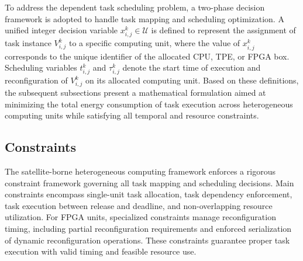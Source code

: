 \documentclass{IEEEtaes}
\begin{document}

To address the dependent task scheduling problem, a two-phase decision framework is adopted to handle task mapping and scheduling optimization. A unified integer decision variable $x_{i,j}^k \in \mathcal{U}$ is defined to represent the assignment of task instance $V_{i,j}^k$ to a specific computing unit, where the value of $x_{i,j}^k$ corresponds to the unique identifier of the allocated CPU, TPE, or FPGA box. Scheduling variables $t_{i,j}^{k}$ and $\tau_{i,j}^{k}$ denote the start time of execution and reconfiguration of $V_{i,j}^{k}$ on its allocated computing unit. Based on these definitions, the subsequent subsections present a mathematical formulation aimed at minimizing the total energy consumption of task execution across heterogeneous computing units while satisfying all temporal and resource constraints.

\subsection{Constraints}

The satellite-borne heterogeneous computing framework enforces a rigorous constraint framework governing all task mapping and scheduling decisions. Main constraints encompass single-unit task allocation, task dependency enforcement, task execution between release and deadline, and non-overlapping resource utilization. 
For FPGA units, specialized constraints manage reconfiguration timing, including partial reconfiguration requirements and enforced serialization of dynamic reconfiguration operations. These constraints guarantee proper task execution with valid timing and feasible resource use.
\end{document}
